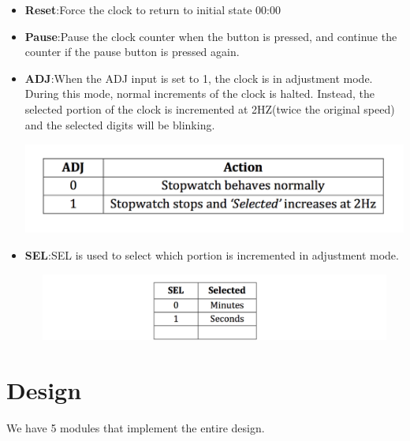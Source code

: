 \documentclass[12pt]{article}
\begin{document}
\begin{itemize}
\item \textbf{Reset}:Force the clock to return to initial state 00:00
\item \textbf{Pause}:Pause the clock counter when the button is pressed, and continue the counter if the pause button is pressed again.
\item \textbf{ADJ}:When the ADJ input is set to 1, the clock is in adjustment mode. During this mode, normal increments of the clock is halted. Instead, the selected portion of the clock is incremented at 2HZ(twice the original speed) and the selected digits will be blinking.\\
\begin{minipage}{\linewidth}
            \centering
            \includegraphics[width=14cm, height=3cm]{adj.png}
        \end{minipage}
\item \textbf{SEL}:SEL is used to select which portion is incremented in adjustment mode.\\
\begin{minipage}{\linewidth}
            \centering
            \includegraphics[width=14cm, height=2.2cm]{sel.png}
        \end{minipage}
\end{itemize}


\section*{Design}
We have 5 modules that implement the entire design.
\end{document}

